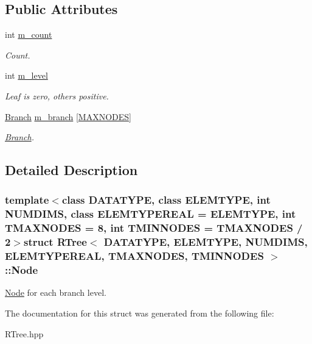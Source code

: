 \subsection*{\-Public \-Attributes}
\begin{DoxyCompactItemize}
\item 
\hypertarget{struct_r_tree_1_1_node_ab2393bb1bfe7c8baa84ec4f205d990ed}{int \hyperlink{struct_r_tree_1_1_node_ab2393bb1bfe7c8baa84ec4f205d990ed}{m\-\_\-count}}\label{struct_r_tree_1_1_node_ab2393bb1bfe7c8baa84ec4f205d990ed}

\begin{DoxyCompactList}\small\item\em \-Count. \end{DoxyCompactList}\item 
\hypertarget{struct_r_tree_1_1_node_a894162b955540567f0519bbbc33a6bf5}{int \hyperlink{struct_r_tree_1_1_node_a894162b955540567f0519bbbc33a6bf5}{m\-\_\-level}}\label{struct_r_tree_1_1_node_a894162b955540567f0519bbbc33a6bf5}

\begin{DoxyCompactList}\small\item\em \-Leaf is zero, others positive. \end{DoxyCompactList}\item 
\hypertarget{struct_r_tree_1_1_node_abc3b3eb3c889a004ca5a30628dd8775a}{\hyperlink{struct_r_tree_1_1_branch}{\-Branch} \hyperlink{struct_r_tree_1_1_node_abc3b3eb3c889a004ca5a30628dd8775a}{m\-\_\-branch} \mbox{[}\hyperlink{class_r_tree_afaccb2e611f17ff46b623771ad7043d7ac05afe446df73fa67991e5199453a37f}{\-M\-A\-X\-N\-O\-D\-E\-S}\mbox{]}}\label{struct_r_tree_1_1_node_abc3b3eb3c889a004ca5a30628dd8775a}

\begin{DoxyCompactList}\small\item\em \hyperlink{struct_r_tree_1_1_branch}{\-Branch}. \end{DoxyCompactList}\end{DoxyCompactItemize}


\subsection{\-Detailed \-Description}
\subsubsection*{template$<$class \-D\-A\-T\-A\-T\-Y\-P\-E, class \-E\-L\-E\-M\-T\-Y\-P\-E, int \-N\-U\-M\-D\-I\-M\-S, class \-E\-L\-E\-M\-T\-Y\-P\-E\-R\-E\-A\-L = \-E\-L\-E\-M\-T\-Y\-P\-E, int \-T\-M\-A\-X\-N\-O\-D\-E\-S = 8, int \-T\-M\-I\-N\-N\-O\-D\-E\-S = \-T\-M\-A\-X\-N\-O\-D\-E\-S / 2$>$struct R\-Tree$<$ D\-A\-T\-A\-T\-Y\-P\-E, E\-L\-E\-M\-T\-Y\-P\-E, N\-U\-M\-D\-I\-M\-S, E\-L\-E\-M\-T\-Y\-P\-E\-R\-E\-A\-L, T\-M\-A\-X\-N\-O\-D\-E\-S, T\-M\-I\-N\-N\-O\-D\-E\-S $>$\-::\-Node}

\hyperlink{struct_r_tree_1_1_node}{\-Node} for each branch level. 

\-The documentation for this struct was generated from the following file\-:\begin{DoxyCompactItemize}
\item 
\-R\-Tree.\-hpp\end{DoxyCompactItemize}
